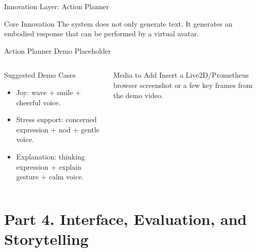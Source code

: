 \documentclass[aspectratio=169]{beamer}
\begin{document}
\begin{frame}{Innovation Layer: Action Planner}
  \begin{block}{Core Innovation}
    The system does not only generate text. It generates an embodied response that can be performed by a virtual avatar.
  \end{block}
  \centering
\end{frame}

\begin{frame}{Action Planner Demo Placeholder}
  \begin{columns}[T,onlytextwidth]
    \begin{block}{Suggested Demo Cases}
      \begin{itemize}
        \item Joy: wave + smile + cheerful voice.
        \item Stress support: concerned expression + nod + gentle voice.
        \item Explanation: thinking expression + explain gesture + calm voice.
      \end{itemize}
    \end{block}
    \begin{block}{Media to Add}
      Insert a Live2D/Prometheus browser screenshot or a few key frames from the demo video.
    \end{block}
  \end{columns}
\end{frame}

\section{Part 4. Interface, Evaluation, and Storytelling}
\end{document}
